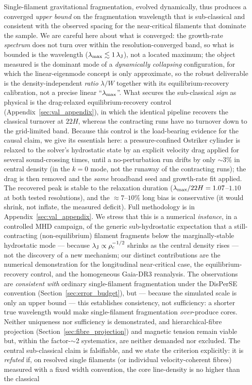 \documentclass[usenatbib,twoside,twocolumn]{mnras}
\begin{document}
Single-filament gravitational fragmentation, evolved dynamically, thus produces a converged \emph{upper bound} on the fragmentation wavelength that is sub-classical and consistent with the observed spacing for the near-critical filaments that dominate the sample. We are careful here about what is converged: the growth-rate \emph{spectrum} does not turn over within the resolution-converged band, so what is bounded is the wavelength ($\lambda_{\rm max}\lesssim1\,\lambda_{\rm J}$), not a located maximum; the object measured is the dominant mode of a \emph{dynamically collapsing} configuration, for which the linear-eigenmode concept is only approximate, so the robust deliverable is the density-independent \emph{ratio} $\lambda/W$ together with its equilibrium-recovery calibration, not a precise linear ``$\lambda_{\rm max}$''. What secures the sub-classical \emph{sign} as physical is the drag-relaxed equilibrium-recovery control (Appendix~\ref{sec:val_appendix}), in which the identical pipeline recovers the classical turnover at $22H$, whereas the contracting runs have no turnover down to the grid-limited band. Because this control is the load-bearing evidence for the causal claim, we give its essentials here: a pressure-confined Ostriker cylinder is relaxed to the solver's hydrostatic state by an explicit velocity drag applied for several sound-crossing times, until a no-perturbation run drifts by only $\sim3\%$ in central density (in the $k=0$ mode, not the runaway of the contracting runs); the drag is then removed and the \emph{same} broadband seed and growth-rate fit applied. The recovered peak is stable to the relaxation duration ($\lambda_{\rm max}/22H=1.07$--$1.10$ at both tested resolutions), and the $\approx7$--$10\%$ long bias is conservative (it would shrink, not inflate, the measured deficit). Full methodology is in Appendix~\ref{sec:val_appendix}. We stress that this is a numerical \emph{instance}, in a controlled MHD campaign, of the generic sub-hydrostatic expectation that a still-contracting (non-equilibrium) filament fragments below the marginally-stable hydrostatic mode \citep{Clarke2016,Clarke2017,Clarke2020} --- because $\lambda_{\rm J}\propto\rho_c^{-1/2}$ shrinks as the central density rises --- not the discovery of a new mechanism; our distinct contributions are the numerical demonstration for the longitudinal near-critical case, the equilibrium-recovery control, and the homogeneous Gaia-DR3 reanalysis. The observations are \emph{consistent with} ordinary single-filament fragmentation under the DisPerSE convention (Section~\ref{sec:error_budget}), but --- because the simulated scale is only an upper bound --- this establishes consistency, not sufficiency: a shorter true wavelength would make single-filament fragmentation \emph{over}-produce cores. Neither uniqueness nor sufficiency is demonstrated, and hierarchical-fibre projection (Section~\ref{sec:fibre_projection}) and magnetic tension remain viable but, within the factor-$\sim$2 systematics, are neither demanded nor excluded. The central sub-classical claim is falsifiable, and we state the criterion explicitly: it is \emph{refuted} if, on resolved single filaments (or individual velocity-coherent fibres) measured with a fixed width convention, the core line-density is no higher than the classical 
\end{document}
